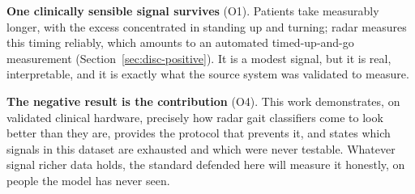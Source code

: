 \textbf{One clinically sensible signal survives} (O1). Patients take measurably
longer, with the excess concentrated in standing up and turning; radar
measures this timing reliably, which amounts to an automated
timed-up-and-go measurement (Section~\ref{sec:disc-positive}). It is a
modest signal, but it is real, interpretable, and it is exactly what the
source system was validated to measure.

\textbf{The negative result is the contribution} (O4). This work demonstrates,
on validated clinical hardware, precisely how radar gait classifiers come to
look better than they are, provides the protocol that prevents it, and
states which signals in this dataset are exhausted and which were never
testable. Whatever signal richer data holds, the standard defended here will
measure it honestly, on people the model has never seen.
